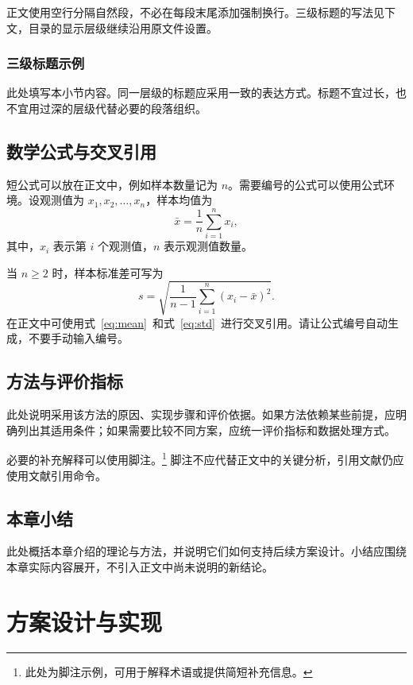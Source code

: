 \documentclass[bachelor]{njupthesis}
\begin{document}
正文使用空行分隔自然段，不必在每段末尾添加强制换行。三级标题的写法见下文，目录的显示层级继续沿用原文件设置。

\subsection{三级标题示例}
此处填写本小节内容。同一层级的标题应采用一致的表达方式。标题不宜过长，也不宜用过深的层级代替必要的段落组织。

\section{数学公式与交叉引用}
短公式可以放在正文中，例如样本数量记为 $n$。需要编号的公式可以使用公式环境。设观测值为 $x_1,x_2,\ldots,x_n$，样本均值为
\begin{equation}
  \bar{x}=\frac{1}{n}\sum_{i=1}^{n}x_i,
  \label{eq:mean}
\end{equation}
其中，$x_i$ 表示第 $i$ 个观测值，$n$ 表示观测值数量。

当 $n\geq2$ 时，样本标准差可写为
\begin{equation}
  s=\sqrt{\frac{1}{n-1}\sum_{i=1}^{n}(x_i-\bar{x})^2}.
  \label{eq:std}
\end{equation}
在正文中可使用式~\eqref{eq:mean}~和式~\eqref{eq:std}~进行交叉引用。请让公式编号自动生成，不要手动输入编号。

\section{方法与评价指标}
此处说明采用该方法的原因、实现步骤和评价依据。如果方法依赖某些前提，应明确列出其适用条件；如果需要比较不同方案，应统一评价指标和数据处理方式。

必要的补充解释可以使用脚注。\footnote{此处为脚注示例，可用于解释术语或提供简短补充信息。}
脚注不应代替正文中的关键分析，引用文献仍应使用文献引用命令。

\section{本章小结}
此处概括本章介绍的理论与方法，并说明它们如何支持后续方案设计。小结应围绕本章实际内容展开，不引入正文中尚未说明的新结论。

\chapter{方案设计与实现}
\label{chap:design}
\end{document}
